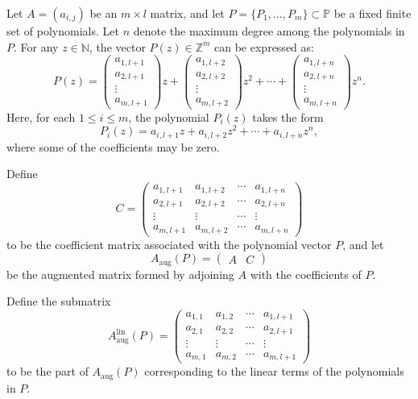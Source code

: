 \documentclass{article}
\theoremstyle{Theorem}
\theoremstyle{definition}
\begin{document}
\medskip


Let \( A = (a_{i,j}) \) be an \( m \times l \) matrix, and let \( P = \{P_1, \ldots, P_m\} \subset \mathbb{P} \) be a fixed finite set of polynomials. Let \( n \) denote the maximum degree among the polynomials in \( P \). For any \( z \in \mathbb{N} \), the vector \( P(z) \in \mathbb{Z}^m \) can be expressed as:
\[
P(z) =
\begin{pmatrix}
a_{1,l+1} \\
a_{2,l+1} \\
\vdots \\
a_{m,l+1}
\end{pmatrix} z +
\begin{pmatrix}
a_{1,l+2} \\
a_{2,l+2} \\
\vdots \\
a_{m,l+2}
\end{pmatrix} z^2 +
\cdots +
\begin{pmatrix}
a_{1,l+n} \\
a_{2,l+n} \\
\vdots \\
a_{m,l+n}
\end{pmatrix} z^n.
\]
Here, for each \( 1 \leq i \leq m \), the polynomial \( P_i(z) \) takes the form
\[
P_i(z) = a_{i,l+1} z + a_{i,l+2} z^2 + \cdots + a_{i,l+n} z^n,
\]
where some of the coefficients may be zero.



Define
\[
C = \begin{pmatrix}
a_{1,l+1} & a_{1,l+2} & \cdots & a_{1,l+n} \\
a_{2,l+1} & a_{2,l+2} & \cdots & a_{2,l+n} \\
\vdots & \vdots & \cdots & \vdots \\
a_{m,l+1} & a_{m,l+2} & \cdots & a_{m,l+n}
\end{pmatrix}
\]
to be the coefficient matrix associated with the polynomial vector \( P \), and let
\[
A_{\text{aug}}(P) = \begin{pmatrix} A & C \end{pmatrix}
\]
be the augmented matrix formed by adjoining \( A \) with the coefficients of \( P \).

Define the submatrix
\[
A_{\text{aug}}^{\text{lin}}(P) =
\begin{pmatrix}
a_{1,1} & a_{1,2} & \cdots & a_{1,l+1} \\
a_{2,1} & a_{2,2} & \cdots & a_{2,l+1} \\
\vdots & \vdots & \cdots & \vdots \\
a_{m,1} & a_{m,2} & \cdots & a_{m,l+1}
\end{pmatrix}
\]
to be the part of \( A_{\text{aug}}(P) \) corresponding to the linear terms of the polynomials in \( P \).
\end{document}
